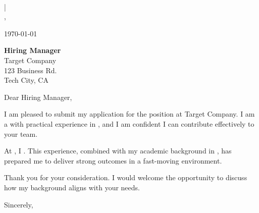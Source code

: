 \documentclass[a4paper,11pt]{article}
\begin{document}
\textbf{}\\
 | \\
, \\
\href{\VAR{basics.url}}{}

\vspace{1cm}
\today

\vspace{1cm}
\textbf{Hiring Manager}\\
Target Company\\
123 Business Rd.\\
Tech City, CA

\vspace{1cm}
Dear Hiring Manager,

\vspace{0.6cm}
I am pleased to submit my application for the position at Target Company. I am a  with practical experience in , and I am confident I can contribute effectively to your team.

\vspace{0.6cm}
At , I . This experience, combined with my academic background in , has prepared me to deliver strong outcomes in a fast-moving environment.

\vspace{0.6cm}
Thank you for your consideration. I would welcome the opportunity to discuss how my background aligns with your needs.

\vspace{1cm}
Sincerely,\\
\vspace{0.8cm}
\end{document}
